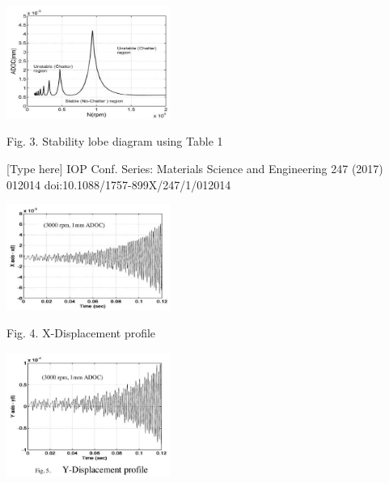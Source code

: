 \documentclass[10pt]{article}
\begin{document}
\begin{center}
\includegraphics[max width=0.4\textwidth]{images/01948e67-2b92-7dd1-b16f-a9746c8d80be_7_546_1546_530_365_0.jpg}
\end{center}
\hspace*{3em} 

Fig. 3. Stability lobe diagram using Table 1

[Type here] IOP Conf. Series: Materials Science and Engineering 247 (2017) 012014 doi:10.1088/1757-899X/247/1/012014

\begin{center}
\includegraphics[max width=0.4\textwidth]{images/01948e67-2b92-7dd1-b16f-a9746c8d80be_8_551_285_542_354_0.jpg}
\end{center}
\hspace*{3em} 

Fig. 4. X-Displacement profile

\begin{center}
\includegraphics[max width=0.4\textwidth]{images/01948e67-2b92-7dd1-b16f-a9746c8d80be_8_545_731_542_411_0.jpg}
\end{center}
\hspace*{3em} 
\end{document}
